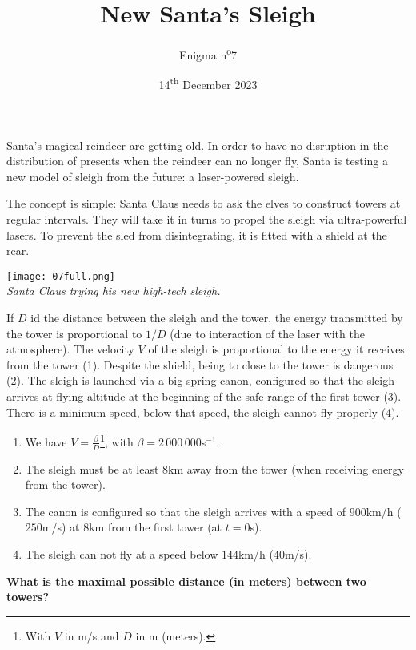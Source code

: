 \documentclass[a4paper, top=10mm]{article}
\title{\textbf{\huge{New Santa's Sleigh}}}
\author{Enigma n\textsuperscript{o}7}
\date{14\textsuperscript{th} December 2023}
\begin{document}
	\maketitle
	
	Santa's magical reindeer are getting old.
	In order to have no disruption in the distribution of presents when the reindeer can no longer fly, Santa is testing a new model of sleigh from the future: a laser-powered sleigh.
	
	The concept is simple: Santa Claus needs to ask the elves to construct towers at regular intervals.
	They will take it in turns to propel the sleigh via ultra-powerful lasers.
	To prevent the sled from disintegrating, it is fitted with a shield at the rear.
	
	\begin{center}
		\texttt{[image: 07full.png]}\\
		\textit{Santa Claus trying his new high-tech sleigh.}
	\end{center}
	
	If $D$ id the distance between the sleigh and the tower, the energy transmitted by the tower is proportional to $1/D$ (due to interaction of the laser with the atmosphere).
	The velocity $V$ of the sleigh is proportional to the energy it receives from the tower (1).
	Despite the shield, being to close to the tower is dangerous (2).
	The sleigh is launched via a big spring canon, configured so that the sleigh arrives at flying altitude at the beginning of the safe range of the first tower (3).
	There is a minimum speed, below that speed, the sleigh cannot fly properly (4).
	
	\begin{enumerate}
		\item We have $V = \frac{\beta}{D}$\footnote{With $V$ in m/s and $D$ in m (meters).}, with $\beta=2\,000\,000$s$ ^{-1}$.
		\item The sleigh must be at least $8$km away from the tower (when receiving energy from the tower).
		\item The canon is configured so that the sleigh arrives with a speed of $900$km/h ($250$m/s) at $8$km from the first tower (at $t=0$s).
		\item The sleigh can not fly at a speed below $144$km/h ($40$m/s).
	\end{enumerate}
	
	\textbf{What is the maximal possible distance (in meters) between two towers?}
	
	
	
	


	
\end{document}
